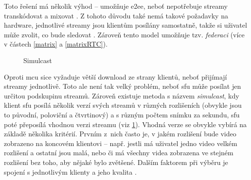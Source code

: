 Toto řešení má několik výhod -- umožňuje \gls{e2ee}, neboť nepotřebuje streamy
transkódovat a mixovat \parencite{WebRTCHacks-TrueE2EE}. Z tohoto důvodu také
nemá takové požadavky na hardware, jednotlivé streamy jsou klientům posílány
samostatně, takže si uživatel může zvolit, co bude sledovat
\parencite{Red5Pro-WebRTCScalingApproaches}. Zároveň tento model umožňuje tzv.
\textit{federaci} (více v částech \ref{matrix} a \ref{matrixRTC}).

\begin{figure}[H]
    \centering
    \caption{Simulcast}
    \label{simulcast}
\end{figure}

Oproti \gls{mcu} sice vyžaduje větší download ze strany klientů, neboť přijímají
streamy jednotlivě. Toto ale není tak velký problém, neboť \gls{sfu} může
posílat jen určitou podskupinu streamů. Zároveň existuje metoda s názvem
\textit{simulcast}, kdy klient \gls{sfu} posílá několik verzí svých streamů v
různých rozlišeních (obvykle jsou to původní, poloviční a čtvrtinový) a s různým
počtem snímku za sekundu, \gls{sfu} poté přeposílá vhodnou verzi streamu (viz
\ref{simulcast}). Vhodná verze se obvykle vybírá na základě několika kritérií.
Prvním z~nich často je, v jakém rozlišení bude video zobrazeno na koncovém
klientovi -- např. jestli má uživatel jedno video velkém rozlišení a ostatní
jsou malá, nebo či má všechny videa zobrazena ve stejném rozlišení bez toho, aby
nějaké bylo zvětšené. Dalším faktorem při výběru je spojení s jednotlivým
klienty a jeho kvalita \parencite{LiveKit-SimulcastIntroduction}.
